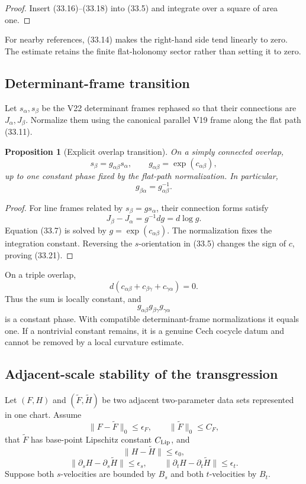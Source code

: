 \documentclass[11pt]{article}
\newtheorem{proposition}[theorem]{Proposition}
\begin{document}
\begin{proof}
Insert (33.16)--(33.18) into (33.5) and integrate over a square of area
one.
\end{proof}

For nearby references, (33.14) makes the right-hand side tend linearly
to zero.  The estimate retains the finite flat-holonomy sector rather
than setting it to zero.

\subsection{Determinant-frame transition}

Let \(s_\alpha,s_\beta\) be the V22 determinant frames rephased so that
their connections are \(J_\alpha,J_\beta\).  Normalize them using the
canonical parallel V19 frame along the flat path (33.11).

\begin{proposition}[Explicit overlap transition]
\label{prop:v11v33-frame-transition}
On a simply connected overlap,
\[
 s_\beta=g_{\alpha\beta}s_\alpha,\qquad
 g_{\alpha\beta}=\exp(c_{\alpha\beta}),
 \tag{33.20}
\]
up to one constant phase fixed by the flat-path normalization.  In
particular,
\[
 g_{\beta\alpha}=g_{\alpha\beta}^{-1}.
 \tag{33.21}
\]
\end{proposition}

\begin{proof}
For line frames related by \(s_\beta=g s_\alpha\), their connection
forms satisfy
\[
 J_\beta-J_\alpha=g^{-1}dg=d\log g.
\]
Equation (33.7) is solved by \(g=\exp(c_{\alpha\beta})\).
The normalization fixes the integration constant.  Reversing the
\(s\)-orientation in (33.5) changes the sign of \(c\), proving
(33.21).
\end{proof}

On a triple overlap,
\[
 d(c_{\alpha\beta}+c_{\beta\gamma}+c_{\gamma\alpha})=0.
 \tag{33.22}
\]
Thus the sum is locally constant, and
\[
 g_{\alpha\beta}g_{\beta\gamma}g_{\gamma\alpha}
 \tag{33.23}
\]
is a constant phase.  With compatible determinant-frame
normalizations it equals one.  If a nontrivial constant remains, it is
a genuine Cech cocycle datum and cannot be removed by a local
curvature estimate.

\subsection{Adjacent-scale stability of the transgression}

Let \((F,H)\) and \((\widetilde F,\widetilde H)\) be two adjacent
two-parameter data sets represented in one chart.  Assume
\[
 \|F-\widetilde F\|_0\leq\epsilon_F,\qquad
 \|\widetilde F\|_0\leq C_F,
 \tag{33.24}
\]
that \(\widetilde F\) has base-point Lipschitz constant
\(C_{\rm Lip}\), and
\[
 \|H-\widetilde H\|\leq\epsilon_0,
 \tag{33.25}
\]
\[
 \|\partial_sH-\partial_s\widetilde H\|\leq\epsilon_s,\qquad
 \|\partial_tH-\partial_t\widetilde H\|\leq\epsilon_t.
 \tag{33.26}
\]
Suppose both \(s\)-velocities are bounded by \(B_s\) and both
\(t\)-velocities by \(B_t\).
\end{document}
